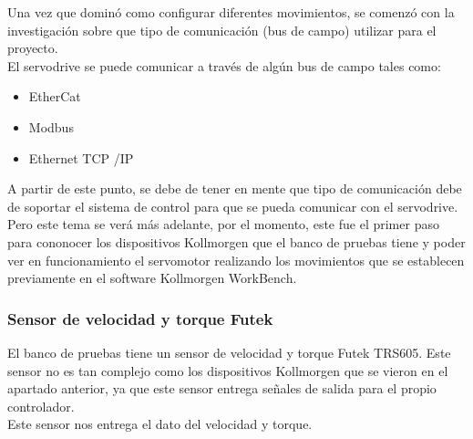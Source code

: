\documentclass[12pt,titlepage]{article}
\begin{document}
\newpage
Una vez que dominó como configurar diferentes movimientos, se comenzó con la investigación sobre que tipo de comunicación (bus de campo) utilizar para el proyecto. \\ 

El servodrive se puede comunicar a través de algún  bus de campo tales como: \\
\begin{itemize}
\item EtherCat 
\item Modbus 
\item Ethernet TCP /IP
\end{itemize}

A partir de este punto, se debe de tener en mente que tipo de comunicación debe de soportar el sistema de control para que se pueda comunicar con el servodrive. \\ 

Pero este tema se verá más adelante, por el momento, este fue el primer paso para cononocer los dispositivos Kollmorgen que el banco de pruebas tiene y poder ver en funcionamiento el servomotor realizando los movimientos que se establecen previamente en el software Kollmorgen WorkBench. \\ 

\subsubsection{Sensor de velocidad y torque Futek } 
El banco de pruebas tiene un sensor de velocidad y torque Futek TRS605. Este sensor no es tan complejo como los dispositivos Kollmorgen que se vieron en el apartado anterior, ya que este sensor entrega señales de salida para el propio controlador. \\

Este sensor nos entrega el dato del velocidad y torque. \\ 
\end{document}
